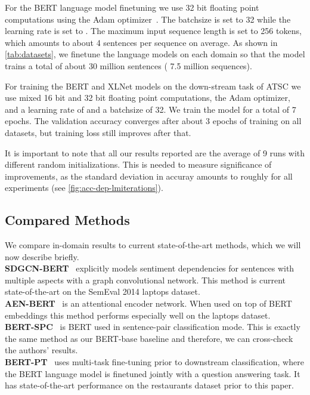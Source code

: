 \documentclass[11pt,a4paper]{article}
\newcommand{\rood}[1]{}
\begin{document}
For the BERT language model finetuning we use 32 bit floating point computations using the Adam optimizer~\cite{ArxKingma2014}. The batchsize is set to 32 while the learning rate is set to . The maximum input sequence length is set to 256 tokens, which amounts to about 4 sentences per sequence on average.
As shown in \autoref{tab:datasets}, we finetune the language models on each domain so that the model trains a total of about 30 million sentences ( 7.5 million sequences). 


For training the BERT and XLNet models on the down-stream task of ATSC we use mixed 16 bit and 32 bit floating point computations, the Adam optimizer, and a learning rate of  and a batchsize of 32. We train the model for a total of 7 epochs. The validation accuracy converges after about 3 epochs of training on all datasets, but training loss still improves after that.

It is important to note that all our results reported are the average of 9 runs with different random initializations. This is needed to measure significance of improvements, as the standard deviation in accuray amounts to roughly  for all experiments (see \autoref{fig:acc-dep-lmiterations}).

\subsection{Compared Methods}
\rood{Outcome: Readers have a short overview of the different models that are compared to our models}

We compare in-domain results to current state-of-the-art methods, which we will now describe briefly. \\
\textbf{SDGCN-BERT}~\cite{ArxZhaoa2019}
explicitly models sentiment dependencies for sentences with multiple aspects with a graph convolutional network. This method is current state-of-the-art on the SemEval 2014 laptops dataset. \\
\textbf{AEN-BERT}~\cite{ArxSong} is an attentional encoder network. When used on top of BERT embeddings this method performs especially well on the laptops dataset. \\
\textbf{BERT-SPC}~\cite{ArxSong}
is BERT used in sentence-pair classification mode. This is exactly the same method as our BERT-base baseline and therefore, we can cross-check the authors' results. \\
\textbf{BERT-PT}~\cite{Xu2019}
uses multi-task fine-tuning prior to downstream classification, where the 
BERT language model is finetuned jointly with a question answering task. It has state-of-the-art performance on the restaurants dataset prior to this paper.
\end{document}
